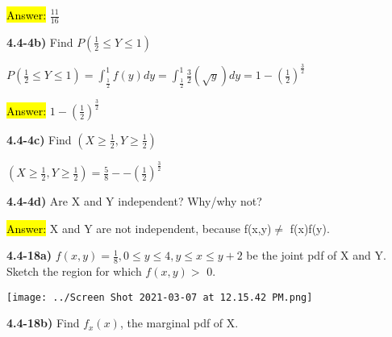 \documentclass{article}
\begin{document}
\vspace{2mm}


\hl{Answer:} $\frac{11}{16}$


\vspace{4mm}

\textbf{4.4-4b)} Find $P(\frac{1}{2} \le Y \le 1)$ 

\vspace{2mm}

$P(\frac{1}{2} \le Y \le 1)=\int_{\frac{1}{2}}^{1}f(y) dy=\int_{\frac{1}{2}}^{1} \frac{3}{2}(\sqrt{y})dy=1-(\frac{1}{2})^{\frac{3}{2}}$

\vspace{2mm}

\hl{Answer:} $1-(\frac{1}{2})^{\frac{3}{2}}$


\vspace{4mm}

\textbf{4.4-4c)} Find $(X \ge \frac{1}{2}, Y \ge \frac{1}{2})$

\vspace{2mm}

$(X \ge \frac{1}{2}, Y \ge \frac{1}{2})=\frac{5}{8}--(\frac{1}{2})^{\frac{3}{2}}$





\vspace{4mm}


\textbf{4.4-4d)} Are X and Y independent? Why/why not?


\vspace{2mm}

\hl{Answer:} X and Y are not independent, because f(x,y)$\ne$ f(x)f(y). 









\newpage
\textbf{ 4.4-18a)} $f(x,y)=\frac{1}{8}, 0 \le y \le 4, y \le x \le y+2$ be the joint pdf of X and Y. Sketch the region for which $f(x,y) >$ 0.

\vspace{2mm}


\texttt{[image: ../Screen Shot 2021-03-07 at 12.15.42 PM.png]}


\vspace{4mm}

\textbf{ 4.4-18b)} Find $f_{x}(x)$, the marginal pdf of X.

\vspace{2mm}
\end{document}
